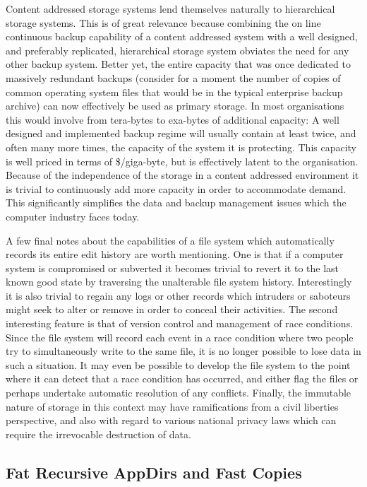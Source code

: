 \documentclass[british,english]{article}
\begin{document}
Content addressed storage systems lend themselves naturally to hierarchical
storage systems. This is of great relevance because combining the
on line continuous backup capability of a content addressed system
with a well designed, and preferably replicated, hierarchical storage
system obviates the need for any other backup system. Better yet,
the entire capacity that was once dedicated to massively redundant
backups (consider for a moment the number of copies of common operating
system files that would be in the typical enterprise backup archive)
can now effectively be used as primary storage. In most organisations
this would involve from tera-bytes to exa-bytes of additional capacity:
A well designed and implemented backup regime will usually contain
at least twice, and often many more times, the capacity of the system
it is protecting. This capacity is well priced in terms of \$/giga-byte,
but is effectively latent to the organisation. Because of the independence
of the storage in a content addressed environment it is trivial to
continuously add more capacity in order to accommodate demand. This
significantly simplifies the data and backup management issues which
the computer industry faces today.

A few final notes about the capabilities of a file system which automatically
records its entire edit history are worth mentioning. One is that
if a computer system is compromised or subverted it becomes trivial
to revert it to the last known good state by traversing the unalterable
file system history. Interestingly it is also trivial to regain any
logs or other records which intruders or saboteurs might seek to alter
or remove in order to conceal their activities. The second interesting
feature is that of version control and management of race conditions.
Since the file system will record each event in a race condition where
two people try to simultaneously write to the same file, it is no
longer possible to lose data in such a situation. It may even be possible
to develop the file system to the point where it can detect that a
race condition has occurred, and either flag the files or perhaps
undertake automatic resolution of any conflicts. Finally, the immutable
nature of storage in this context may have ramifications from a civil
liberties perspective, and also with regard to various national privacy
laws which can require the irrevocable destruction of data.


\subsection{Fat Recursive AppDirs and Fast Copies}
\end{document}
